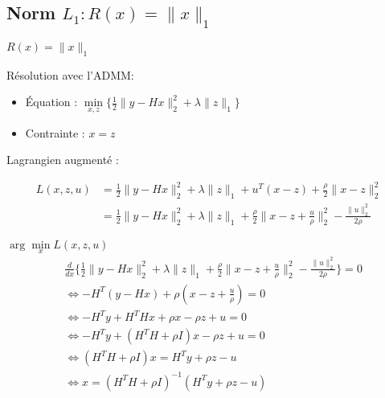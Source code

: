 \subsection{Norm $L_{1} : R(x) = \lVert x \rVert_{1}$}

\frame{
    \tableofcontents[ 
        currentsubsection, 
    ]
}

\begin{frame}{$R(x) = \lVert x \rVert_{1}$}

Résolution avec l'ADMM:
\begin{itemize}
    \item Équation : $\min\limits_{x, z} \{ 
        \frac{1}{2} \lVert y - Hx \rVert_{2}^{2} 
        + \lambda \lVert z \rVert_{1} 
    \}$
    \item Contrainte : $x = z$
\end{itemize}

\vspace{5mm}

Lagrangien augmenté :

\begin{align*}
L(x, z, u) 
&= \frac{1}{2} \lVert y - Hx \rVert_{2}^{2} 
+ \lambda \lVert z \rVert_{1} 
+ u^{T}(x-z) + \frac{\rho}{2} \lVert x-z \rVert_{2}^{2} \\
&= \frac{1}{2} \lVert y - Hx \rVert_{2}^{2} 
+ \lambda \lVert z \rVert_{1}
+ \frac{\rho}{2} \lVert x - z + \frac{u}{\rho} \rVert_{2}^{2} 
- \frac{\lVert u \rVert_{2}^{2}}{2\rho}    
\end{align*}

\end{frame}

\begin{frame}{$\arg\min\limits_{x} {L(x, z, u)}$}
\begin{align*}
&\frac{d}{dx} \{
    \frac{1}{2} \lVert y - Hx \rVert_{2}^{2} 
    + \lambda \lVert z \rVert_{1} 
    + \frac{\rho}{2} \lVert x - z + \frac{u}{\rho} \rVert_{2}^{2} 
    - \frac{\lVert u \rVert_{2}^{2}}{2\rho}
\} = 0 \\
&\iff -H^{T} (y - Hx) + \rho (x - z + \frac{u}{\rho}) = 0 \\
&\iff -H^{T} y + H^{T} H x + \rho x - \rho z + u = 0 \\
&\iff -H^{T} y + (H^{T}H + \rho I) x - \rho z + u = 0 \\
&\iff (H^{T}H + \rho I) x = H^{T}y + \rho z - u\\
&\iff x = (H^{T}H + \rho I)^{-1} (H^{T} y + \rho z - u) \\
\end{align*}
\end{frame}

